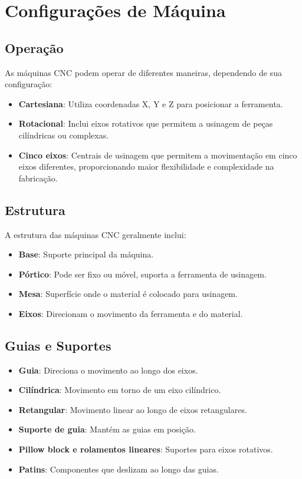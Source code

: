 \documentclass[
]{book}
\providecommand{\tightlist}{%
  \setlength{\itemsep}{0pt}\setlength{\parskip}{0pt}}
\begin{document}
\section{Configurações de Máquina}\label{configurauxe7uxf5es-de-muxe1quina}

\subsection{Operação}\label{operauxe7uxe3o}

As máquinas CNC podem operar de diferentes maneiras, dependendo de sua configuração:

\begin{itemize}
\tightlist
\item
  \textbf{Cartesiana}: Utiliza coordenadas X, Y e Z para posicionar a ferramenta.
\item
  \textbf{Rotacional}: Inclui eixos rotativos que permitem a usinagem de peças cilíndricas ou complexas.
\item
  \textbf{Cinco eixos}: Centrais de usinagem que permitem a movimentação em cinco eixos diferentes, proporcionando maior flexibilidade e complexidade na fabricação.
\end{itemize}

\subsection{Estrutura}\label{estrutura}

A estrutura das máquinas CNC geralmente inclui:

\begin{itemize}
\tightlist
\item
  \textbf{Base}: Suporte principal da máquina.
\item
  \textbf{Pórtico}: Pode ser fixo ou móvel, suporta a ferramenta de usinagem.
\item
  \textbf{Mesa}: Superfície onde o material é colocado para usinagem.
\item
  \textbf{Eixos}: Direcionam o movimento da ferramenta e do material.
\end{itemize}

\subsection{Guias e Suportes}\label{guias-e-suportes}

\begin{itemize}
\tightlist
\item
  \textbf{Guia}: Direciona o movimento ao longo dos eixos.
\item
  \textbf{Cilíndrica}: Movimento em torno de um eixo cilíndrico.
\item
  \textbf{Retangular}: Movimento linear ao longo de eixos retangulares.
\item
  \textbf{Suporte de guia}: Mantém as guias em posição.
\item
  \textbf{Pillow block e rolamentos lineares}: Suportes para eixos rotativos.
\item
  \textbf{Patins}: Componentes que deslizam ao longo das guias.
\end{itemize}
\end{document}
